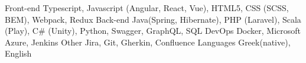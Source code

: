 

\begin{cvskills}
	\cvskill
		{Front-end} %
		{
			Typescript, Javascript (Angular, React, Vue), HTML5, CSS (SCSS, BEM), Webpack, Redux
		} %
	\cvskill
		{Back-end} %
		{
			Java(Spring, Hibernate), PHP (Laravel), Scala (Play), C\# (Unity), Python, Swagger, GraphQL, SQL
		} %
	\cvskill
		{DevOps} %
		{Docker, Microsoft Azure, Jenkins} %
	\cvskill
		{Other} %
		{Jira, Git, Gherkin, Confluence} %
	\cvskill
		{Languages} %
		{Greek(native), English} %
\end{cvskills}
